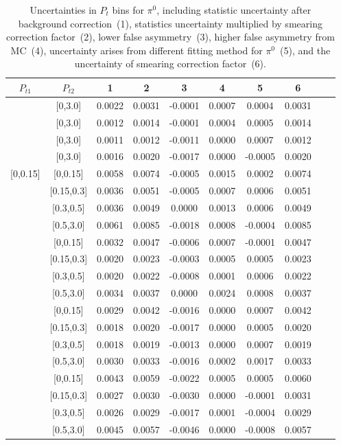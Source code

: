 \begin{table}[H]\scriptsize
\centering
\begin{tabular}{|c| c| c| c| c| c| c| c| c| c|}
\hline
$P_{t1}$ & $P_{t2}$ & 1 & 2 & 3 & 4& 5& 6 \\ \hline
[0,0.15]	&	[0,3.0]	&	0.0022	&	0.0031	&	-0.0001	&	0.0007	&	0.0004	&	0.0031	\\ \hline
[0.15,0.3]	&	[0,3.0]	&	0.0012	&	0.0014	&	-0.0001	&	0.0004	&	0.0005	&	0.0014	\\ \hline
[0.3,0.5]	&	[0,3.0]	&	0.0011	&	0.0012	&	-0.0011	&	0.0000	&	0.0007	&	0.0012	\\ \hline
[0.5,3.0]	&	[0,3.0]	&	0.0016	&	0.0020	&	-0.0017	&	0.0000	&	-0.0005	&	0.0020	\\ \hline
															
[0,0.15]	&	[0,0.15]	&	0.0058	&	0.0074	&	-0.0005	&	0.0015	&	0.0002	&	0.0074	\\ \hline
[0,0.15]	&	[0.15,0.3]	&	0.0036	&	0.0051	&	-0.0005	&	0.0007	&	0.0006	&	0.0051	\\ \hline
[0,0.15]	&	[0.3,0.5]	&	0.0036	&	0.0049	&	0.0000	&	0.0013	&	0.0006	&	0.0049	\\ \hline
[0,0.15]	&	[0.5,3.0]	&	0.0061	&	0.0085	&	-0.0018	&	0.0008	&	-0.0004	&	0.0085	\\ \hline
[0.15,0.3]	&	[0,0.15]	&	0.0032	&	0.0047	&	-0.0006	&	0.0007	&	-0.0001	&	0.0047	\\ \hline
[0.15,0.3]	&	[0.15,0.3]	&	0.0020	&	0.0023	&	-0.0003	&	0.0005	&	0.0005	&	0.0023	\\ \hline
[0.15,0.3]	&	[0.3,0.5]	&	0.0020	&	0.0022	&	-0.0008	&	0.0001	&	0.0006	&	0.0022	\\ \hline
[0.15,0.3]	&	[0.5,3.0]	&	0.0034	&	0.0037	&	0.0000	&	0.0024	&	0.0008	&	0.0037	\\ \hline
[0.3,0.5]	&	[0,0.15]	&	0.0029	&	0.0042	&	-0.0016	&	0.0000	&	0.0007	&	0.0042	\\ \hline
[0.3,0.5]	&	[0.15,0.3]	&	0.0018	&	0.0020	&	-0.0017	&	0.0000	&	0.0005	&	0.0020	\\ \hline
[0.3,0.5]	&	[0.3,0.5]	&	0.0018	&	0.0019	&	-0.0013	&	0.0000	&	0.0007	&	0.0019	\\ \hline
[0.3,0.5]	&	[0.5,3.0]	&	0.0030	&	0.0033	&	-0.0016	&	0.0002	&	0.0017	&	0.0033	\\ \hline
[0.5,3.0]	&	[0,0.15]	&	0.0043	&	0.0059	&	-0.0022	&	0.0005	&	0.0005	&	0.0060	\\ \hline
[0.5,3.0]	&	[0.15,0.3]	&	0.0027	&	0.0030	&	-0.0030	&	0.0000	&	-0.0001	&	0.0031	\\ \hline
[0.5,3.0]	&	[0.3,0.5]	&	0.0026	&	0.0029	&	-0.0017	&	0.0001	&	-0.0004	&	0.0029	\\ \hline
[0.5,3.0]	&	[0.5,3.0]	&	0.0045	&	0.0057	&	-0.0046	&	0.0000	&	-0.0008	&	0.0057	\\ \hline
\end{tabular}
\caption{Uncertainties in $P_t$ bins for $\pi^0$, including statistic uncertainty after background correction~(1), statistics uncertainty multiplied by smearing correction factor~(2), lower false asymmetry~(3), higher false asymmetry from MC~(4), uncertainty arises from different fitting method for $\pi^0$~(5), and the uncertainty of smearing correction factor~(6).}
\label{tab:pi0errors_pt}
\end{table}

